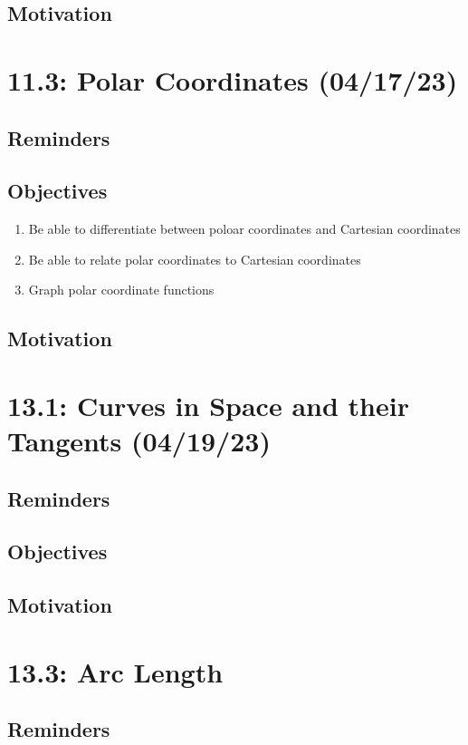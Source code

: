 \documentclass{report}
\begin{document}
\begin{sloppypar}
\begin{enumerate}
\end{enumerate}

\section{Motivation}
\chapter{11.3: Polar Coordinates (04/17/23)}
\section{Reminders}
\section{Objectives}
\begin{enumerate}
  \item Be able to differentiate between poloar
        coordinates and Cartesian coordinates
  \item Be able to relate polar coordinates to
        Cartesian coordinates
  \item Graph polar coordinate functions

\end{enumerate}

\section{Motivation}
\chapter{13.1: Curves in Space and their Tangents (04/19/23)}
\section{Reminders}
\section{Objectives}
\section{Motivation}
\chapter{13.3: Arc Length}
\section{Reminders}

\end{sloppypar}
\end{document}
